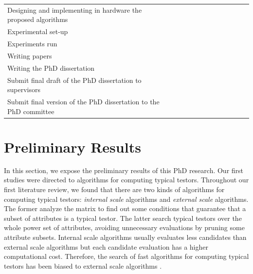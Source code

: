 \documentclass[authoryear,11pt]{elsarticle}
\begin{document}
\begin{table}[h!]
\begin{tabular}{|p{7cm}|c|c|c|c|c|c|c|c|c|c|c|c|}
		&&&&&&&\cellcolor[gray]{0.9}&\cellcolor[gray]{0.9}&\cellcolor[gray]{0.9}&&&\\
		\hline
		Designing and implementing in hardware the proposed algorithms
		&&&&&&&&\cellcolor[gray]{0.9}&\cellcolor[gray]{0.9}&&&\\
		\hline
		Experimental set-up &\cellcolor{blue}&\cellcolor{blue}&&\cellcolor[gray]{0.9}&
		\cellcolor[gray]{0.9}&&\cellcolor[gray]{0.9}&\cellcolor[gray]{0.9}&&&&\\
		\hline
		Experiments run &&&\cellcolor{blue}&\cellcolor[gray]{0.9}&&\cellcolor[gray]{0.9}&\cellcolor[gray]{0.9}&&
		\cellcolor[gray]{0.9}&&&\\
		\hline
		Writing papers &\cellcolor{blue}&&\cellcolor{blue}&&\cellcolor[gray]{0.9}&&\cellcolor[gray]{0.9}&&
		\cellcolor[gray]{0.9}&&&\\
		\hline
		Writing the PhD dissertation &&&&\cellcolor[gray]{0.9}&\cellcolor[gray]{0.9}&\cellcolor[gray]{0.9}&
		\cellcolor[gray]{0.9}&\cellcolor[gray]{0.9}&\cellcolor[gray]{0.9}&&&\\
		\hline
		Submit final draft of the PhD dissertation to supervisors &&&&&&&&&&\cellcolor[gray]{0.9}&&\\
		\hline
		Submit final version of the PhD dissertation to the PhD committee &&&&&&&&&&&\cellcolor[gray]{0.9}&\\
		\hline
		
 	\end{tabular}             
 \end{table}
 
	  	

\section{Preliminary Results}
	In this section, we expose the preliminary results of this PhD research.
	Our first studies were directed to algorithms for computing typical testors. 
	Throughout our first literature review, we found that there are two kinds of algorithms for computing 
	typical testors: \emph{internal scale} algorithms and \emph{external scale} algorithms. 
	The former analyze the matrix to find out some conditions that guarantee that a subset of attributes 
	is a typical testor. The latter search typical testors over the whole power set of attributes, 
	avoiding unnecessary evaluations by pruning some attribute subsets. 
	Internal scale algorithms usually evaluates less candidates than external scale algorithms but each 
	candidate evaluation has a higher computational cost. Therefore, the search of fast algorithms for computing
	typical testors has been biased to external scale algorithms \citep{Alba14}.
	
\end{document}
